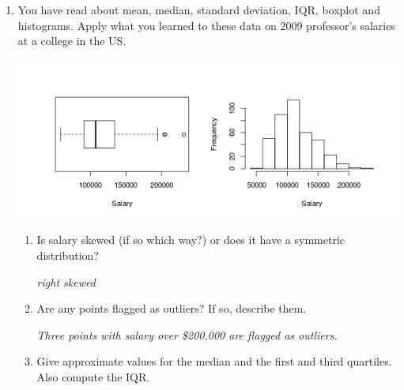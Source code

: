 \begin{enumerate}
\begin{key}
  {\it  Center is generally the easiest.  One could argue that spread
    is hard because you have to read the scales carefully, plus it
    depends on your amount of ambition for a good grade.  Skew is also
  hard because it require a close comparison of each tail. In this
  case, lots of A's are clearly preferred to an even spread or to more
D's.}
\end{key}



\item 
  You  have read about mean, median, standard deviation, IQR,
  boxplot and histograms.  Apply what you learned
  to these data on   2009 professor's salaries at a college in the US.

   \includegraphics[width=.8\linewidth]{../plots/salaryBoxHist.png}
  \begin{enumerate}
    \item  Is salary skewed (if so which way?) or does it have a
      symmetric distribution? 
\begin{students}
    \vspace{1cm}    
\end{students}

\begin{key}
  {\it  right skewed}
\end{key}

    \item Are any points flagged as outliers?  If so, describe them. 
\begin{students}
    \vspace{1cm}    
\end{students}

\begin{key}
  {\it Three points with salary over \$200,000 are flagged as outliers.}
\end{key}
     \item  Give approximate values for the median and the first and
       third quartiles.  Also compute the IQR.
\begin{students}
    \vspace{1cm}    
\end{students}


\end{enumerate}
\end{enumerate}
